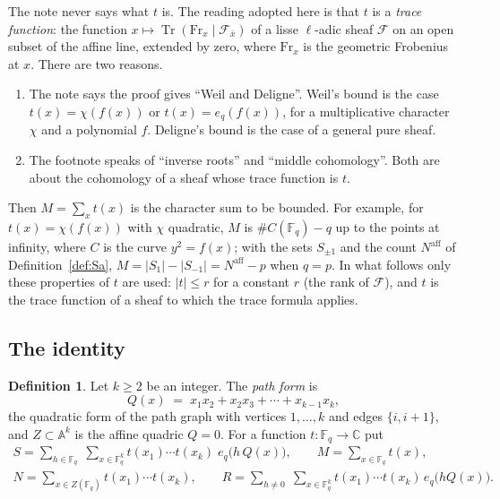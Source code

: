 \documentclass[11pt]{amsbook}
\theoremstyle{plain}
\theoremstyle{definition}
\newtheorem{definition}[theorem]{Definition}
\theoremstyle{remark}
\numberwithin{equation}{section}
\numberwithin{figure}{chapter}
\numberwithin{table}{chapter}
\renewcommand{\C}{\mathbb{C}}
\newcommand{\F}{\mathbb{F}}
\newcommand{\Fr}{\mathrm{Fr}}
\newcommand{\Tr}{\operatorname{Tr}}
\newcommand{\cF}{\mathcal{F}}
\begin{document}
The note never says what $t$ is. The reading adopted here is that
$t$ is a \emph{trace function}: the function
$x \mapsto \Tr(\Fr_x \mid \cF_{\bar x})$ of a lisse $\ell$-adic
sheaf $\cF$ on an open subset of the affine line, extended by
zero, where $\Fr_x$ is the geometric Frobenius at $x$. There are
two reasons.
\begin{enumerate}[label=(\roman*)]
\item The note says the proof gives ``Weil and Deligne''. Weil's
  bound is the case $t(x) = \chi(f(x))$ or $t(x) = e_q(f(x))$, for
  a multiplicative character $\chi$ and a polynomial $f$. Deligne's
  bound is the case of a general pure sheaf.
\item The footnote speaks of ``inverse roots'' and ``middle
  cohomology''. Both are about the cohomology of a sheaf whose
  trace function is $t$.
\end{enumerate}
Then $M = \sum_x t(x)$ is the character sum to be bounded. For
example, for $t(x) = \chi(f(x))$ with $\chi$ quadratic, $M$ is
$\#C(\F_q) - q$ up to the points at infinity, where $C$ is the
curve $y^2 = f(x)$; with the sets $S_{\pm1}$ and the count
$N^{\mathrm{aff}}$ of Definition~\ref{def:Sa},
$M=\lvert S_1\rvert-\lvert S_{-1}\rvert=N^{\mathrm{aff}}-p$ when
$q=p$. In what follows only these
properties of $t$ are used: $|t| \le r$ for a constant $r$ (the
rank of $\cF$), and $t$ is the trace function of a sheaf to which
the trace formula applies.

\subsection{The identity}

\begin{definition}\label{def:sign-sums}
Let $k \ge 2$ be an integer. The \emph{path form} is
\[
  Q(x) \;=\; x_1x_2 + x_2x_3 + \cdots + x_{k-1}x_k ,
\]
the quadratic form of the path graph with vertices $1, \dots, k$
and edges $\{i, i+1\}$, and $Z \subset \mathbb{A}^k$ is the affine
quadric $Q = 0$. For a function $t\colon\F_q\to\C$ put
\begin{gather*}
  S = \sum_{h\in\F_q}\;\sum_{x\in\F_q^k}
  t(x_1)\cdots t(x_k)\; e_q\bigl(h\,Q(x)\bigr),\qquad
  M = \sum_{x\in\F_q} t(x),\\
  N = \sum_{x\in Z(\F_q)} t(x_1)\cdots t(x_k),\qquad
  R = \sum_{h \ne 0}\;\sum_{x\in\F_q^k}
  t(x_1)\cdots t(x_k)\, e_q\bigl(hQ(x)\bigr).
\end{gather*}
\end{definition}
\end{document}
